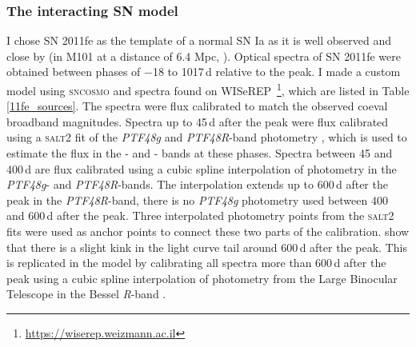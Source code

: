 \documentclass[a4paper,oneside,12pt, class=Latex/Classes/PhDthesisPSnPDF, crop=false]{standalone}
\begin{document}
\subsubsection{The interacting SN model}
\label{model_description}
I chose SN 2011fe as the template of a normal SN Ia as it is well observed and close by (in M101 at a distance of 6.4 Mpc, \citealt{M101_cep_dist}). Optical spectra of SN 2011fe were obtained between phases of $-$18 to 1017\,d relative to the peak. I made a custom model using \textsc{sncosmo} and spectra found on WISeREP \citep{wiserep}\,\footnote{\url{https://wiserep.weizmann.ac.il}}, which are listed in Table \ref{11fe_sources}. The spectra were flux calibrated to match the observed coeval broadband magnitudes. Spectra up to 45\,d after the peak were flux calibrated using a \textsc{salt2} \citep{salt2} fit of the \textit{PTF48g} and \textit{PTF48R}-band photometry \citep{PTF_1, PTF_2}, which is used to estimate the flux in the \ztfg- and \ztfr- bands at these phases. Spectra between 45 and 400\,d are flux calibrated using a cubic spline interpolation of photometry in the \textit{PTF48g}- and \textit{PTF48R}-bands. The interpolation extends up to 600\,d after the peak in the \textit{PTF48R}-band, there is no \textit{PTF48g} photometry used between 400 and 600\,d after the peak. Three interpolated photometry points from the \textsc{salt2} fits were used as anchor points to connect these two parts of the calibration. \citet{Georgios_11fe} show that there is a slight kink in the light curve tail around 600\,d after the peak. This is replicated in the model by calibrating all spectra more than 600\,d after the peak using a cubic spline interpolation of photometry from the Large Binocular Telescope \citep[LBT;][]{LBT} in the Bessel \textit{R}-band \citep{Shappee_11fe}.
\end{document}
